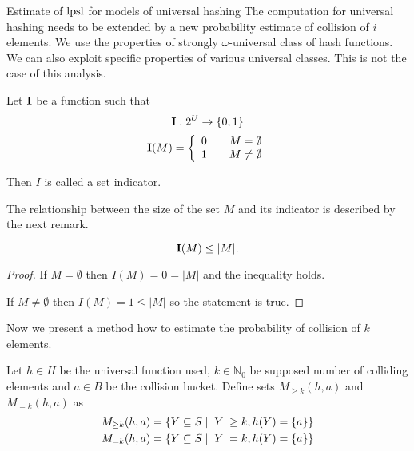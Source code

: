 \begin{section}{Estimate of $\mathrm{lpsl}$ for models of universal hashing}
The computation for universal hashing needs to be extended by a new probability estimate of collision of $i$ elements. We use the properties of strongly $\omega$-universal class of hash functions. We can also exploit specific properties of various universal classes. This is not the case of this analysis.

\begin{definition}
Let $\mathbf{I}$ be a function such that
\begin{displaymath}
\mathbf{I}: 2^U \rightarrow \lbrace 0, 1 \rbrace
\end{displaymath}
\begin{displaymath}
\mathbf{I}(M) = \left\{ 
\begin{array}{l l}
  0 & \quad M = \emptyset \\
  1 & \quad M \neq \emptyset \\
\end{array} \right.
\end{displaymath}

Then $I$ is called a set indicator.
\end{definition}

The relationship between the size of the set $M$ and its indicator is described by the next remark.
\begin{remark}
\[\mathbf{I}(M) \leq |M| \textit{.} \]
\end{remark}
\begin{proof}
If $M = \emptyset$ then $I(M) = 0 = |M|$ and the inequality holds. 

If $M \neq \emptyset$ then $I(M) = 1 \leq |M|$ so the statement is true.
\end{proof}

Now we present a method how to estimate the probability of collision of $k$ elements.
\begin{definition}
Let $h \in H$ be the universal function used, $k \in \mathbb{N}_0$ be supposed number of colliding elements and $a \in B$ be the collision bucket. Define sets $M_{\geq k}(h, a)$ and $M_{= k}(h, a)$ as
\begin{displaymath}
\begin{split}
M_{\geq k}(h, a) & = \{Y \subseteq S \mid |Y| \geq k, h(Y) = \{a\}\} \\
M_{= k}(h, a) & = \{Y \subseteq S \mid |Y| = k, h(Y) = \{a\}\} 
\end{split}
\end{displaymath}
\end{definition}


\end{section}
